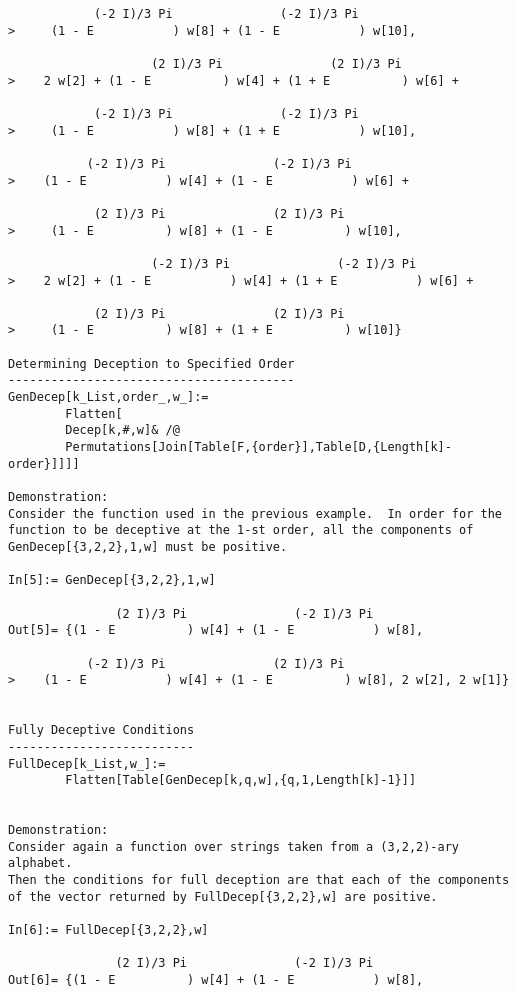 \begin{verbatim}
            (-2 I)/3 Pi               (-2 I)/3 Pi
>     (1 - E           ) w[8] + (1 - E           ) w[10], 
 
                    (2 I)/3 Pi               (2 I)/3 Pi
>    2 w[2] + (1 - E          ) w[4] + (1 + E          ) w[6] + 
 
            (-2 I)/3 Pi               (-2 I)/3 Pi
>     (1 - E           ) w[8] + (1 + E           ) w[10], 
 
           (-2 I)/3 Pi               (-2 I)/3 Pi
>    (1 - E           ) w[4] + (1 - E           ) w[6] + 
 
            (2 I)/3 Pi               (2 I)/3 Pi
>     (1 - E          ) w[8] + (1 - E          ) w[10], 
 
                    (-2 I)/3 Pi               (-2 I)/3 Pi
>    2 w[2] + (1 - E           ) w[4] + (1 + E           ) w[6] + 
 
            (2 I)/3 Pi               (2 I)/3 Pi
>     (1 - E          ) w[8] + (1 + E          ) w[10]}

Determining Deception to Specified Order
----------------------------------------
GenDecep[k_List,order_,w_]:=
        Flatten[
        Decep[k,#,w]& /@
        Permutations[Join[Table[F,{order}],Table[D,{Length[k]-order}]]]]

Demonstration:
Consider the function used in the previous example.  In order for the
function to be deceptive at the 1-st order, all the components of
GenDecep[{3,2,2},1,w] must be positive.

In[5]:= GenDecep[{3,2,2},1,w]

               (2 I)/3 Pi               (-2 I)/3 Pi
Out[5]= {(1 - E          ) w[4] + (1 - E           ) w[8], 
 
           (-2 I)/3 Pi               (2 I)/3 Pi
>    (1 - E           ) w[4] + (1 - E          ) w[8], 2 w[2], 2 w[1]}


Fully Deceptive Conditions
--------------------------
FullDecep[k_List,w_]:=
        Flatten[Table[GenDecep[k,q,w],{q,1,Length[k]-1}]]


Demonstration:
Consider again a function over strings taken from a (3,2,2)-ary alphabet.
Then the conditions for full deception are that each of the components
of the vector returned by FullDecep[{3,2,2},w] are positive.

In[6]:= FullDecep[{3,2,2},w]

               (2 I)/3 Pi               (-2 I)/3 Pi
Out[6]= {(1 - E          ) w[4] + (1 - E           ) w[8], 
 

\end{verbatim}
